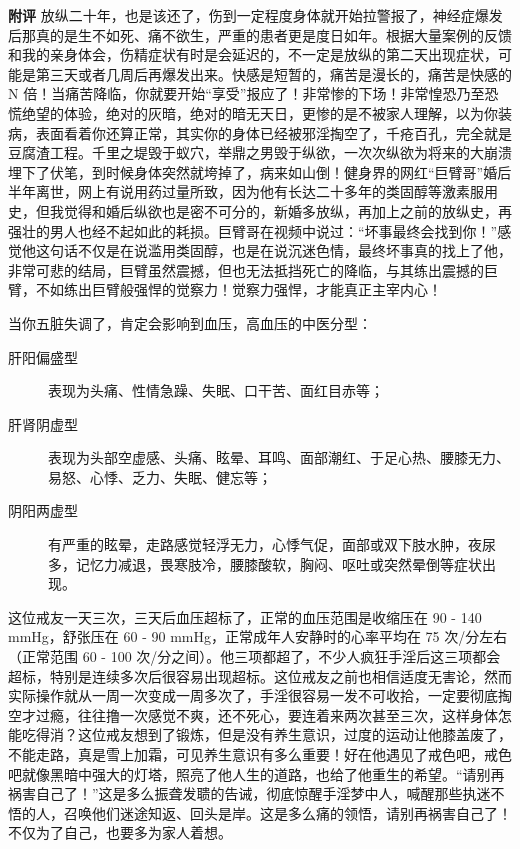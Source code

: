 \begin{case}
    \textbf{附评} 放纵二十年，也是该还了，伤到一定程度身体就开始拉警报了，神经症爆发后那真的是生不如死、痛不欲生，严重的患者更是度日如年。根据大量案例的反馈和我的亲身体会，伤精症状有时是会延迟的，不一定是放纵的第二天出现症状，可能是第三天或者几周后再爆发出来。快感是短暂的，痛苦是漫长的，痛苦是快感的 N 倍！当痛苦降临，你就要开始“享受”报应了！非常惨的下场！非常惶恐乃至恐慌绝望的体验，绝对的灰暗，绝对的暗无天日，更惨的是不被家人理解，以为你装病，表面看着你还算正常，其实你的身体已经被邪淫掏空了，千疮百孔，完全就是豆腐渣工程。千里之堤毁于蚁穴，举鼎之男毁于纵欲，一次次纵欲为将来的大崩溃埋下了伏笔，到时候身体突然就垮掉了，病来如山倒！健身界的网红“巨臂哥”婚后半年离世，网上有说用药过量所致，因为他有长达二十多年的类固醇等激素服用史，但我觉得和婚后纵欲也是密不可分的，新婚多放纵，再加上之前的放纵史，再强壮的男人也经不起如此的耗损。巨臂哥在视频中说过：“坏事最终会找到你！”感觉他这句话不仅是在说滥用类固醇，也是在说沉迷色情，最终坏事真的找上了他，非常可悲的结局，巨臂虽然震撼，但也无法抵挡死亡的降临，与其练出震撼的巨臂，不如练出巨臂般强悍的觉察力！觉察力强悍，才能真正主宰内心！

    当你五脏失调了，肯定会影响到血压，高血压的中医分型：

    \begin{description}
        \item[肝阳偏盛型] 表现为头痛、性情急躁、失眠、口干苦、面红目赤等；
        \item[肝肾阴虚型] 表现为头部空虚感、头痛、眩晕、耳鸣、面部潮红、于足心热、腰膝无力、易怒、心悸、乏力、失眠、健忘等；
        \item[阴阳两虚型] 有严重的眩晕，走路感觉轻浮无力，心悸气促，面部或双下肢水肿，夜尿多，记忆力减退，畏寒肢冷，腰膝酸软，胸闷、呕吐或突然晕倒等症状出现。
    \end{description} 这位戒友一天三次，三天后血压超标了，正常的血压范围是收缩压在 90 - 140 \unit{\mmHg}，舒张压在 60 - 90 \unit{\mmHg}，正常成年人安静时的心率平均在 75 次/分左右（正常范围 60 - 100 次/分之间）。他三项都超了，不少人疯狂手淫后这三项都会超标，特别是连续多次后很容易出现超标。这位戒友之前也相信适度无害论，然而实际操作就从一周一次变成一周多次了，手淫很容易一发不可收拾，一定要彻底掏空才过瘾，往往撸一次感觉不爽，还不死心，要连着来两次甚至三次，这样身体怎能吃得消？这位戒友想到了锻炼，但是没有养生意识，过度的运动让他膝盖废了，不能走路，真是雪上加霜，可见养生意识有多么重要！好在他遇见了戒色吧，戒色吧就像黑暗中强大的灯塔，照亮了他人生的道路，也给了他重生的希望。“请别再祸害自己了！”这是多么振聋发聩的告诫，彻底惊醒手淫梦中人，喊醒那些执迷不悟的人，召唤他们迷途知返、回头是岸。这是多么痛的领悟，请别再祸害自己了！不仅为了自己，也要多为家人着想。
\end{case}

